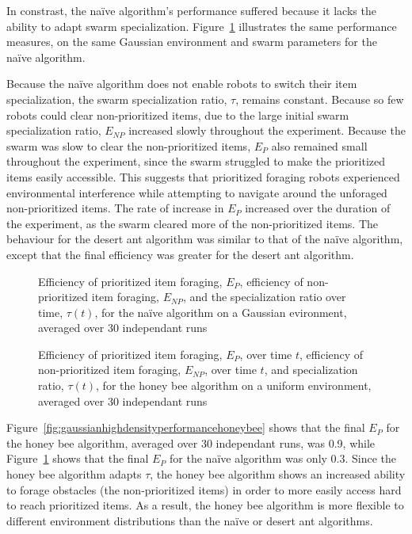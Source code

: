In constrast, the na\"ive algorithm's performance suffered because it lacks the ability to adapt swarm specialization. Figure~\ref{fig:gaussianhighdensityperformancenaive} illustrates the same performance measures, on the same Gaussian environment and swarm parameters for the na\"ive algorithm.  

Because the na\"ive algorithm does not enable robots to switch their item specialization, the swarm specialization ratio, $\tau$, remains constant. Because so few robots could clear non-prioritized items, due to the large initial swarm specialization ratio, $E_{NP}$ increased slowly throughout the experiment. Because the swarm was slow to clear the non-prioritized items, $E_P$ also remained small throughout the experiment, since the swarm struggled to make the prioritized items easily accessible. This suggests that prioritized foraging robots experienced environmental interference while attempting to navigate around the unforaged non-prioritized items. The rate of increase in $E_P$ increased over the duration of the experiment, as the swarm cleared more of the non-prioritized items. The behaviour for the desert ant algorithm was similar to that of the na\"ive algorithm, except that the final efficiency was greater for the desert ant algorithm.


\begin{figure}[!htbp]
\centering
\small
\resizebox{\textwidth}{!}{}
\caption{Efficiency of prioritized item foraging, $E_P$, efficiency of non-prioritized item foraging, $E_{NP}$, and the specialization ratio over time, $\tau(t)$, for the na\"ive algorithm on a Gaussian evironment, averaged over 30 independant runs}
\label{fig:gaussianhighdensityperformancenaive}
\end{figure}

\begin{figure}[!htb]
\centering
\small
\resizebox{\textwidth}{!}{}
\caption{Efficiency of prioritized item foraging, $E_P$, over time $t$, efficiency of non-prioritized item foraging, $E_{NP}$, over time $t$, and specialization ratio, $\tau(t)$, for the honey bee algorithm on a uniform environment, averaged over 30 independant runs}
\label{fig:uniformhighdensityperformancehoneybee}
\end{figure}


Figure~\ref{fig:gaussianhighdensityperformancehoneybee} shows that the final $E_P$ for the honey bee algorithm, averaged over 30 independant runs, was 0.9, while Figure~\ref{fig:gaussianhighdensityperformancenaive} shows that the final $E_P$ for the na\"ive algorithm was only 0.3. Since the honey bee algorithm adapts $\tau$, the honey bee algorithm shows an increased ability to forage obstacles (the non-prioritized items) in order to more easily access hard to reach prioritized items. As a result, the honey bee algorithm is more flexible to different environment distributions than the na\"ive or desert ant algorithms.


